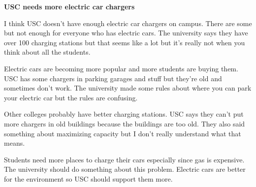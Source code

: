 \documentclass[12pt]{article}
\begin{document}
\newpage
\begin{originalversion}
\textbf{USC needs more electric car chargers}

I think USC doesn't have enough electric car chargers on campus. There are some but not enough for everyone who has electric cars. The university says they have over 100 charging stations but that seems like a lot but it's really not when you think about all the students.

Electric cars are becoming more popular and more students are buying them. USC has some chargers in parking garages and stuff but they're old and sometimes don't work. The university made some rules about where you can park your electric car but the rules are confusing.

Other colleges probably have better charging stations. USC says they can't put more chargers in old buildings because the buildings are too old. They also said something about maximizing capacity but I don't really understand what that means.

Students need more places to charge their cars especially since gas is expensive. The university should do something about this problem. Electric cars are better for the environment so USC should support them more.
\end{originalversion}
\end{document}
